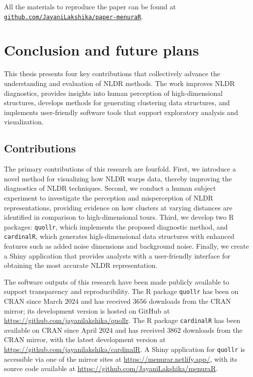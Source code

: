 \documentclass[
  11pt,
  a4paper,
]{report}
\begin{document}
All the materials to reproduce the paper can be found at
\href{https://github.com/JayaniLakshika/paper-menuraR.git}{\texttt{github.com/JayaniLakshika/paper-menuraR}}.


\chapter{Conclusion and future plans}\label{sec-conclusion}

This thesis presents four key contributions that collectively advance
the understanding and evaluation of NLDR methods. The work improves NLDR
diagnostics, provides insights into human perception of high-dimensional
structures, develops methods for generating clustering data structures,
and implements user-friendly software tools that support exploratory
analysis and visualization.

\section{Contributions}\label{contributions}

The primary contributions of this research are fourfold. First, we
introduce a novel method for visualizing how NLDR warps data, thereby
improving the diagnostics of NLDR techniques. Second, we conduct a human
subject experiment to investigate the perception and misperception of
NLDR representations, providing evidence on how clusters at varying
distances are identified in comparison to high-dimensional tours. Third,
we develop two R packages: \texttt{quollr}, which implements the
proposed diagnostic method, and \texttt{cardinalR}, which generates
high-dimensional data structures with enhanced features such as added
noise dimensions and background noise. Finally, we create a Shiny
application that provides analysts with a user-friendly interface for
obtaining the most accurate NLDR representation.

The software outputs of this research have been made publicly available
to support transparency and reproducibility. The R package
\texttt{quollr} has been on CRAN since March \(2024\) and has received
\(3656\) downloads from the CRAN mirror; its development version is
hosted on GitHub at \url{https://github.com/jayanilakshika/quollr}. The
R package \texttt{cardinalR} has been available on CRAN since April
\(2024\) and has received \(3862\) downloads from the CRAN mirror, with
the latest development version at
\url{https://github.com/jayanilakshika/cardinalR}. A Shiny application
for \texttt{quollr} is accessible via one of the mirror sites at
\url{https://menurar.netlify.app/}, with its source code available at
\url{https://github.com/JayaniLakshika/menuraR}.
\end{document}
